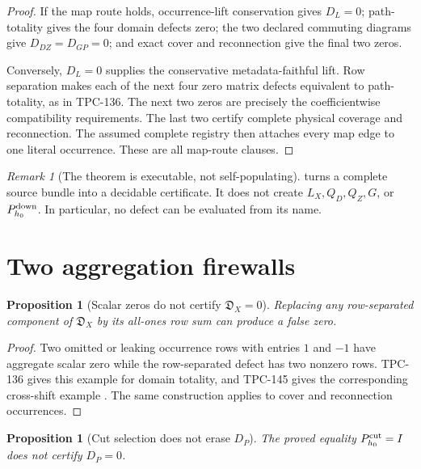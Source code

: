 \documentclass[11pt]{article}
\newtheorem{proposition}[theorem]{Proposition}
\theoremstyle{definition}
\theoremstyle{remark}
\newtheorem{remark}[theorem]{Remark}
\begin{document}
\begin{proof}
If the map route holds, occurrence-lift conservation gives \(D_L=0\);
path-totality gives the four domain defects zero; the two declared
commuting diagrams give \(D_{DZ}=D_{GP}=0\); and exact cover and
reconnection give the final two zeros.

Conversely, \(D_L=0\) supplies the conservative metadata-faithful
lift.  Row separation makes each of the next four zero matrix
defects equivalent to path-totality, as in TPC-136.  The next two
zeros are precisely the coefficientwise compatibility requirements.
The last two certify complete physical coverage and reconnection.
The assumed complete registry then attaches every map edge to one
literal occurrence.  These are all map-route clauses.
\end{proof}

\begin{remark}[The theorem is executable, not self-populating]
 turns a complete source bundle into a decidable
certificate.  It does not create \(L_X,Q_D,Q_Z,G\), or
\(P_{h_0}^{\rm down}\).  In particular, no defect can be evaluated
from its name.
\end{remark}

\section{Two aggregation firewalls}

\begin{proposition}[Scalar zeros do not certify \(\mathfrak D_X=0\)]
\label{prop:scalar}
Replacing any row-separated component of \(\mathfrak D_X\) by its
all-ones row sum can produce a false zero.
\end{proposition}

\begin{proof}
Two omitted or leaking occurrence rows with entries \(1\) and \(-1\)
have aggregate scalar zero while the row-separated defect has two
nonzero rows.  TPC-136 gives this example for domain totality, and
TPC-145 gives the corresponding cross-shift example
\citep{WangTPC136,WangTPC145}.  The same construction applies to
cover and reconnection occurrences.
\end{proof}

\begin{proposition}[Cut selection does not erase \(D_P\)]
\label{prop:cutP}
The proved equality \(P_{h_0}^{\rm cut}=I\) does not certify
\(D_P=0\).
\end{proposition}
\end{document}
